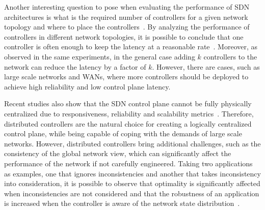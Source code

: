 
Another interesting question to pose when evaluating the performance of SDN architectures is what is the required number of controllers for a given network topology and where to place the controllers~\cite{heller2012,philip2014cross}. 
By analyzing the performance of controllers in different network topologies, it is possible to conclude that one controller is often enough to keep the latency at a reasonable rate~\cite{heller2012}. 
Moreover, as observed in the same experiments, in the general case adding $k$ controllers to the network can reduce the latency by a factor of $k$. However, there are cases, such as large scale networks and WANs, where more controllers should be deployed to achieve high reliability and low control plane latency. 

Recent studies also show that the SDN control plane cannot be fully physically centralized due to responsiveness, reliability and scalability metrics~\cite{levin2012,philip2014cross}. 
Therefore, distributed controllers are the natural choice for creating a logically centralized control plane, while being capable of coping with the demands of large scale networks. 
However, distributed controllers bring additional challenges, such as the consistency of the global network view, which can significantly affect the performance of the network if not carefully engineered. 
Taking two applications as examples, one that ignores inconsistencies and another that takes inconsistency into consideration, it is possible to observe that optimality is significantly affected when inconsistencies are not considered and that the robustness of an application is increased when the controller is aware of the network state distribution~\cite{levin2012}.

